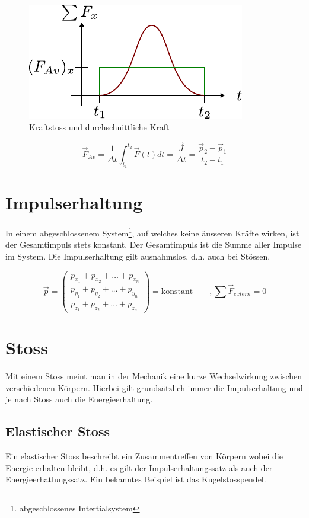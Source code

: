 \begin{figure}[h!]
	\centering
	\includegraphics[scale=0.75]{kraftstoss.pdf}
	\caption{Kraftstoss und durchschnittliche Kraft}
	\label{fig:kraftstoss}
\end{figure}

\[ \boxed{\vec{F}_{Av} = \frac{1}{\Delta t} \int_{t_1}^{t_2} \vec{F}(t)dt = 
	\frac{\vec{J}}{\Delta t} = \frac{\vec{p}_2 - \vec{p}_1}{t_2 - t_1}} \]

\section{Impulserhaltung}
In einem abgeschlossenem System\footnote{abgeschlossenes Intertialsystem},
auf welches keine äusseren Kräfte wirken, ist der Gesamtimpuls stets 
konstant. Der Gesamtimpuls ist die Summe aller Impulse im System. 
Die Impulserhaltung gilt ausnahmslos, d.h. auch bei Stössen.

\[ \boxed{\vec{p} =
\begin{pmatrix}
	p_{x_1} + p_{x_2} + \dots + p_{x_n} \\
	p_{y_1} + p_{y_2} + \dots + p_{y_n} \\
	p_{z_1} + p_{z_2} + \dots + p_{z_n} 
\end{pmatrix}
= \text{konstant}
\qquad ,\sum \vec{F}_{extern}=0
}\]

\section{Stoss}
Mit einem Stoss meint man in der Mechanik eine kurze Wechselwirkung zwischen
verschiedenen Körpern. Hierbei gilt grundsätzlich immer die Impulserhaltung
und je nach Stoss auch die Energieerhaltung.

\subsection{Elastischer Stoss}
Ein elastischer Stoss beschreibt ein Zusammentreffen von Körpern wobei die
Energie erhalten bleibt, d.h. es gilt der Impulserhaltungssatz als auch der
Energieerhatlungssatz. Ein bekanntes Beispiel ist das Kugelstosspendel.

